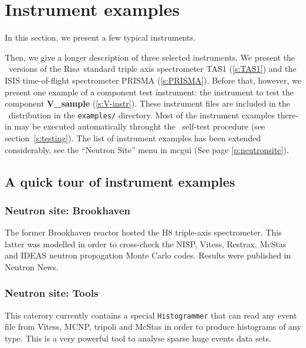 
\chapter{Instrument examples}
\label{s:instrument}

In this section, we present a few typical instruments.

Then, we give a longer description of three selected
instruments. We present the \MCS\ versions of
the Ris\o\ standard triple axis spectrometer TAS1 (\ref{s:TAS1})
and the ISIS time-of-flight spectrometer PRISMA (\ref{s:PRISMA}).
Before that, however, we present one example of a component
test instrument: the instrument to test the component
{\bf V\_sample} (\ref{s:V-instr}).
%
These instrument files are included in the \MCS\ distribution
in the \verb+examples/+ directory.
Most of the instrument examples there-in may be executed automatically throught the \MCS\ self-test procedure (see section~\ref{s:testing}).
The list of instrument examples has been extended considerably, see
the ``Neutron Site'' menu in mcgui (See page \ref{p:neutronsite}). 

\section{A quick tour of instrument examples}
\label{s:quick-tour-instr}

\subsection{Neutron site: Brookhaven}

The former Brookhaven reactor hosted the H8 triple-axis spectrometer. This latter was modelled in order to cross-check the NISP, Vitess, Restrax, McStas and IDEAS neutron propagation Monte Carlo codes. Results were published in Neutron News.

\subsection{Neutron site: Tools}

This caterory currently contains a special \verb+Histogrammer+ that can read any event file from Vitess, MCNP, tripoli and McStas in order to produce histograms of any type. This is a very powerful tool to analyse sparse huge events data sets.

